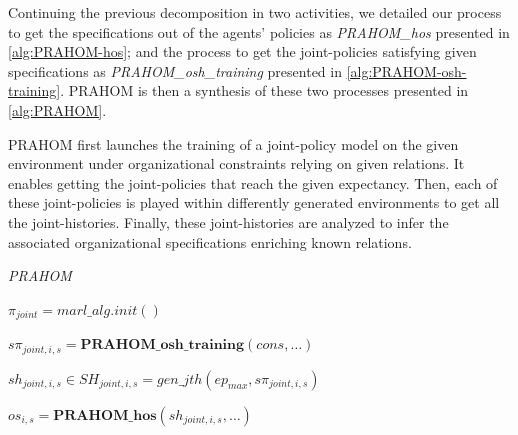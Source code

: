 \documentclass[runningheads]{llncs}
\newcounter{relation}
\begin{document}
Continuing the previous decomposition in two activities, we detailed our process to get the specifications out of the agents' policies as \emph{PRAHOM\_hos} presented in \autoref{alg:PRAHOM-hos}; and the process to get the joint-policies satisfying given specifications as \emph{PRAHOM\_osh\_training} presented in \autoref{alg:PRAHOM-osh-training}. PRAHOM is then a synthesis of these two processes presented in \autoref{alg:PRAHOM}.

PRAHOM first launches the training of a joint-policy model on the given environment under organizational constraints relying on given relations. It enables getting the joint-policies that reach the given expectancy. Then, each of these joint-policies is played within differently generated environments to get all the joint-histories. Finally, these joint-histories are analyzed to infer the associated organizational specifications enriching known relations.


\begin{algorithm}[hbt!]
    \caption{\emph{PRAHOM}}\label{alg:PRAHOM}




    $\pi_{joint} = marl\_alg.init()$


    $s\pi_{joint,i,s} = \mathbf{PRAHOM\_osh\_training}(cons,\dots)$


    $sh_{joint,i,s} \in SH_{joint,i,s} = gen\_jth(ep_{max}, s\pi_{joint,i,s})$

    $os_{i,s} = \mathbf{PRAHOM\_hos}(sh_{joint,i,s},\dots)$

\end{algorithm}
\end{document}
